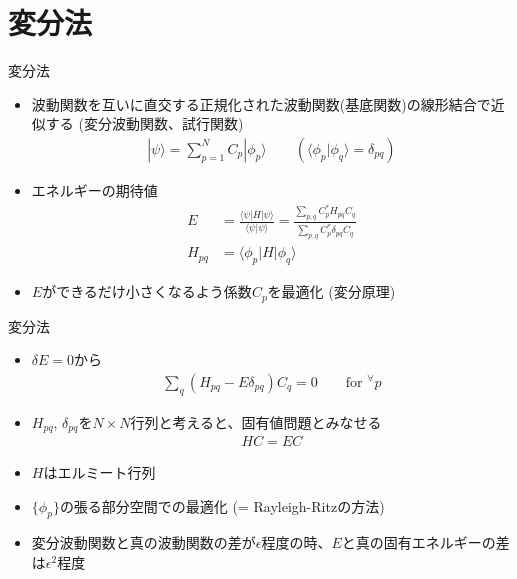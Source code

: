\section{変分法}

\begin{frame}[t,fragile]{変分法}
  \begin{itemize}
  \item 波動関数を互いに直交する正規化された波動関数(基底関数)の線形結合で近似する (変分波動関数、試行関数)
    \begin{align*}
      | \psi \rangle = \sum_{p=1}^N C_p | \phi_p \rangle \qquad (\langle \phi_p | \phi_q \rangle = \delta_{pq})
    \end{align*}
  \item エネルギーの期待値
    \begin{align*}
      E &= \frac{\langle \psi | H | \psi \rangle}{\langle \psi | \psi \rangle} = \frac{\sum_{p,q} C_p^* H_{pq} C_q}{\sum_{p,q} C_p^* \delta_{pq} C_q} \\
      H_{pq} &= \langle \phi_p | H | \phi_q \rangle
    \end{align*}
  \item $E$ができるだけ小さくなるよう係数$C_p$を最適化 (変分原理)
  \end{itemize}
\end{frame}

\begin{frame}[t,fragile]{変分法}
  \begin{itemize}
  \item $\delta E = 0$から
    \begin{align*}
      \sum_{q} (H_{pq} - E \delta_{pq} ) C_q = 0 \qquad \text{for $^\forall p$}
    \end{align*}
  \item $H_{pq}$, $\delta_{pq}$を$N \times N$行列と考えると、固有値問題とみなせる
    \begin{align*}
      H C = E C
    \end{align*}
  \item $H$はエルミート行列
  \item $\{ \phi_p \}$の張る部分空間での最適化 (= Rayleigh-Ritzの方法)
  \item 変分波動関数と真の波動関数の差が$\epsilon$程度の時、$E$と真の固有エネルギーの差は$\epsilon^2$程度
  \end{itemize}
\end{frame}


